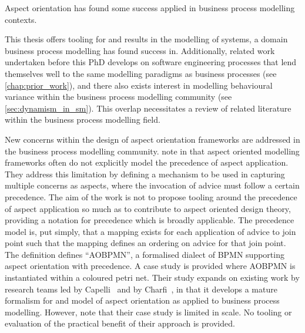 
Aspect orientation has found some success applied in business process modelling
contexts. 

This thesis offers tooling for and results in the modelling of \sociotechnical
systems, a domain business process modelling has found success in. Additionally,
related work undertaken before this PhD develops on software engineering
processes that lend themselves well to the same modelling paradigms as business
processes (see \cref{chap:prior_work}), and there also exists interest in
modelling behavioural variance within the business process modelling community
(see \cref{sec:dynamism_in_sm}). This overlap necessitates a review of related
literature within the business process modelling field.

New concerns within the design of aspect orientation frameworks are addressed in
the business process modelling community.  note in
\cite{jalali2012aspect} that aspect oriented modelling frameworks often do not
explicitly model the precedence of aspect application. They address this
limitation by defining a mechanism to be used in capturing multiple concerns as
aspects, where the invocation of advice must follow a certain precedence. The
aim of the work is not to propose tooling around the precedence of aspect
application so much as to contribute to aspect oriented design theory, providing
a notation for precedence which is broadly applicable. The precedence model is,
put simply, that a mapping exists for each application of advice to join point
such that the mapping defines an ordering on advice for that join point. The
definition defines ``AOBPMN'', a formalised dialect of BPMN supporting aspect
orientation with precedence. A case study is provided where AOBPMN is
instantiated within a coloured petri net. Their study expands on existing work
by research teams led by Capelli~\cite{Cappelli_AOBPM,da2020implementation} and
by Charfi~\cite{charfi2007ao4bpel}, in that it develops a mature formalism for
and model of aspect orientation as applied to business process modelling.
However, \citeauthor{jalali2012aspect} note that their case study is limited in
scale. No tooling or evaluation of the practical benefit of their approach is
provided.




